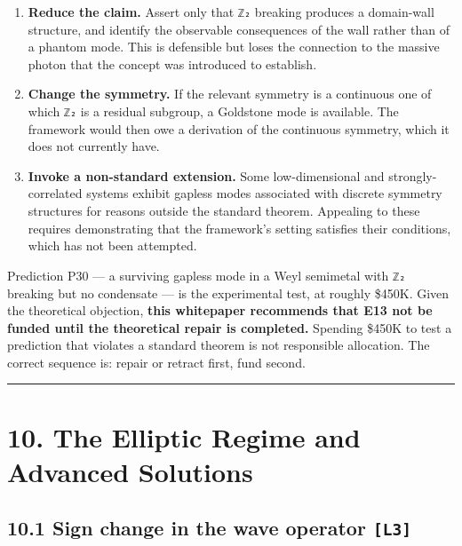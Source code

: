 \documentclass[
  11pt]{report}
\providecommand{\tightlist}{%
  \setlength{\itemsep}{0pt}\setlength{\parskip}{0pt}}
\begin{document}
\begin{enumerate}
\def\labelenumi{\arabic{enumi}.}
\tightlist
\item
  \textbf{Reduce the claim.} Assert only that \texttt{ℤ₂} breaking
  produces a domain-wall structure, and identify the observable
  consequences of the wall rather than of a phantom mode. This is
  defensible but loses the connection to the massive photon that the
  concept was introduced to establish.
\item
  \textbf{Change the symmetry.} If the relevant symmetry is a continuous
  one of which \texttt{ℤ₂} is a residual subgroup, a Goldstone mode is
  available. The framework would then owe a derivation of the continuous
  symmetry, which it does not currently have.
\item
  \textbf{Invoke a non-standard extension.} Some low-dimensional and
  strongly-correlated systems exhibit gapless modes associated with
  discrete symmetry structures for reasons outside the standard theorem.
  Appealing to these requires demonstrating that the framework's setting
  satisfies their conditions, which has not been attempted.
\end{enumerate}

Prediction P30 --- a surviving gapless mode in a Weyl semimetal with
\texttt{ℤ₂} breaking but no condensate --- is the experimental test, at
roughly \$450K. Given the theoretical objection, \textbf{this whitepaper
recommends that E13 not be funded until the theoretical repair is
completed.} Spending \$450K to test a prediction that violates a
standard theorem is not responsible allocation. The correct sequence is:
repair or retract first, fund second.

\begin{center}\rule{0.5\linewidth}{0.5pt}\end{center}

\hypertarget{the-elliptic-regime-and-advanced-solutions}{%
\chapter{10. The Elliptic Regime and Advanced
Solutions}\label{the-elliptic-regime-and-advanced-solutions}}

\hypertarget{sign-change-in-the-wave-operator-l3}{%
\section{\texorpdfstring{10.1 Sign change in the wave operator
\texttt{{[}L3{]}}}{10.1 Sign change in the wave operator {[}L3{]}}}\label{sign-change-in-the-wave-operator-l3}}
\end{document}
